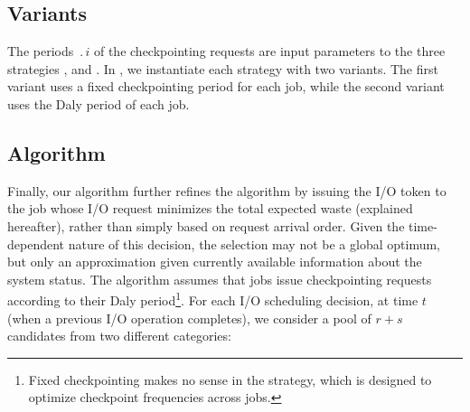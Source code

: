 
\subsection{Variants}
\label{sec:variants}

The periods $\period{i}$ of the checkpointing requests are  input parameters to the three strategies
 \nocoop, \fifoblock and \fifononblock. In , we instantiate each strategy with two variants. The first variant uses a fixed checkpointing period 
 for each job, while the second variant uses the Daly period of each job.
 
\subsection{\leastwaste Algorithm}
\label{sec:least-waste}

Finally, our \leastwaste algorithm further refines the \fifononblock algorithm by
issuing the I/O token to the job whose I/O request minimizes the total expected waste
(explained hereafter), rather than simply based on request arrival order.  Given the
time-dependent nature of this decision, the selection may not be a global optimum,
but only an approximation given currently available information about the system
status. The \leastwaste algorithm assumes that jobs issue checkpointing requests according
 to their Daly period\footnote{Fixed checkpointing makes no sense in the \leastwaste strategy,
 which is
designed to optimize checkpoint frequencies across jobs.}.
 For each I/O scheduling decision, at time $t$ (when a previous I/O operation
completes), we consider a pool of $r+s$ candidates from two different categories:

